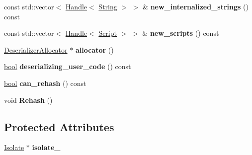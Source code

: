 \begin{DoxyCompactItemize}
\item 
\mbox{\label{classv8_1_1internal_1_1Deserializer_a9900ef2c027a50ddee644c2a29811504}} 
const std\+::vector$<$ \mbox{\hyperlink{classv8_1_1internal_1_1Handle}{Handle}}$<$ \mbox{\hyperlink{classv8_1_1internal_1_1String}{String}} $>$ $>$ \& {\bfseries new\+\_\+internalized\+\_\+strings} () const
\item 
\mbox{\label{classv8_1_1internal_1_1Deserializer_aad92226e8ccc3690223245d1b0b338b9}} 
const std\+::vector$<$ \mbox{\hyperlink{classv8_1_1internal_1_1Handle}{Handle}}$<$ \mbox{\hyperlink{classv8_1_1internal_1_1Script}{Script}} $>$ $>$ \& {\bfseries new\+\_\+scripts} () const
\item 
\mbox{\label{classv8_1_1internal_1_1Deserializer_a49ef689eeafac337b0c03c36af6b1e06}} 
\mbox{\hyperlink{classv8_1_1internal_1_1DeserializerAllocator}{Deserializer\+Allocator}} $\ast$ {\bfseries allocator} ()
\item 
\mbox{\label{classv8_1_1internal_1_1Deserializer_a1459b2a7b0998a3a30e56b5f14eeba06}} 
\mbox{\hyperlink{classbool}{bool}} {\bfseries deserializing\+\_\+user\+\_\+code} () const
\item 
\mbox{\label{classv8_1_1internal_1_1Deserializer_a6c8b74c1dbaca3da043bc38c9f2385b4}} 
\mbox{\hyperlink{classbool}{bool}} {\bfseries can\+\_\+rehash} () const
\item 
\mbox{\label{classv8_1_1internal_1_1Deserializer_a44c58f1efaced2dc0f286382598dec26}} 
void {\bfseries Rehash} ()
\end{DoxyCompactItemize}
\subsection*{Protected Attributes}
\begin{DoxyCompactItemize}
\item 
\mbox{\label{classv8_1_1internal_1_1Deserializer_a1382ad0863b0ac0a93f8043c663cd9b9}} 
\mbox{\hyperlink{classv8_1_1internal_1_1Isolate}{Isolate}} $\ast$ {\bfseries isolate\+\_\+}
\end{DoxyCompactItemize}
